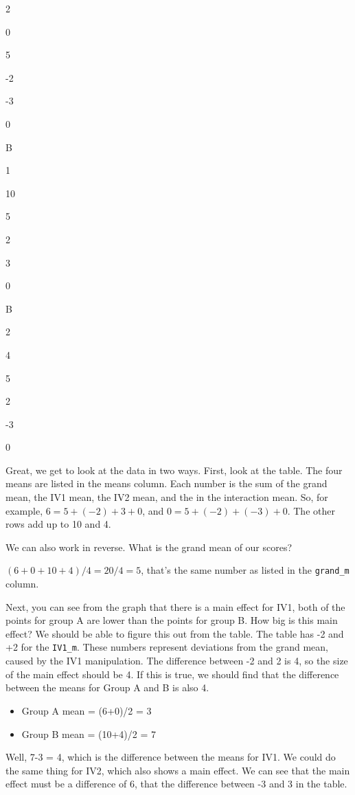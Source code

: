 \documentclass[]{book}
\begin{document}
2

0

5

-2

-3

0

B

1

10

5

2

3

0

B

2

4

5

2

-3

0

Great, we get to look at the data in two ways. First, look at the table. The four means are listed in the means column. Each number is the sum of the grand mean, the IV1 mean, the IV2 mean, and the in the interaction mean. So, for example, \(6 = 5 + (-2) + 3 + 0\), and \(0 = 5 + (-2) + (-3) + 0\). The other rows add up to 10 and 4.

We can also work in reverse. What is the grand mean of our scores?

\((6+0+10+4)/4 =20/4 = 5\), that's the same number as listed in the \texttt{grand\_m} column.

Next, you can see from the graph that there is a main effect for IV1, both of the points for group A are lower than the points for group B. How big is this main effect? We should be able to figure this out from the table. The table has -2 and +2 for the \texttt{IV1\_m}. These numbers represent deviations from the grand mean, caused by the IV1 manipulation. The difference between -2 and 2 is 4, so the size of the main effect should be 4. If this is true, we should find that the difference between the means for Group A and B is also 4.

\begin{itemize}
\item
  Group A mean = (6+0)/2 = 3
\item
  Group B mean = (10+4)/2 = 7
\end{itemize}

Well, 7-3 = 4, which is the difference between the means for IV1. We could do the same thing for IV2, which also shows a main effect. We can see that the main effect must be a difference of 6, that the difference between -3 and 3 in the table.
\end{document}
